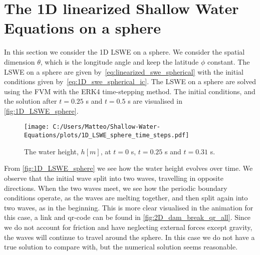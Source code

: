 \section{The 1D linearized Shallow Water Equations on a sphere}\label{sec:1D_sphere}
In this section we consider the 1D LSWE on a sphere.
We consider the spatial dimension $\theta$, which is the longitude angle and keep the latitude $\phi$ constant.
The LSWE on a sphere are given by~\eqref{eq:linearized_swe_spherical} with the initial conditions given by~\eqref{eq:1D_swe_spherical_ic}.
The LSWE on a sphere are solved using the FVM with the ERK4 time-stepping method.
The initial conditions, and the solution after $t = 0.25$ s and $t = 0.5$ s are visualised in \autoref{fig:1D_LSWE_sphere}.
\begin{figure}[H]
    \centering
    \texttt{[image: C:/Users/Matteo/Shallow-Water-Equations/plots/1D\_LSWE\_sphere\_time\_steps.pdf]}
    \caption{The water height, $h[m]$, at $t = 0$ s, $t = 0.25$ s and $t = 0.31$ s.}\label{fig:1D_LSWE_sphere}
\end{figure}
From \autoref{fig:1D_LSWE_sphere} we see how the water height evolves over time.
We observe that the initial wave split into two waves, travelling in opposite directions.
When the two waves meet, we see how the periodic boundary conditions operate, as the waves are melting together, and then split again into two waves, as in the beginning.
This is more clear visualised in the animation for this case, a link and qr-code can be found in \autoref{fig:2D_dam_break_qr_all}.
Since we do not account for friction and have neglecting external forces except gravity, the waves will continue to travel around the sphere.
In this case we do not have a true solution to compare with, but the numerical solution seems reasonable.


